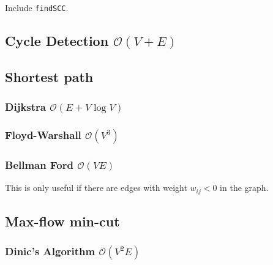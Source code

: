 \documentclass[8pt,a4paper,landscape,oneside]{amsart}
\begin{document}
\begin{multicols*}{3}
Include \texttt{findSCC}.



\subsection{Cycle Detection $\mathcal{O}(V + E)$}



\subsection{Shortest path}

\subsubsection{Dijkstra $\mathcal{O}(E + V \log V)$}

\subsubsection{Floyd-Warshall $\mathcal{O}(V^{3})$}



\subsubsection{Bellman Ford $\mathcal{O}(V E)$}

This is only useful if there are edges with weight $w_{i j} < 0$ in the graph.



\subsection{Max-flow min-cut}
\subsubsection{Dinic's Algorithm $\mathcal{O}(V^{2} E)$}

\begin{comment}
// http://www.slideshare.net/KuoE0/acmicpc-dinics-algorithm
\end{comment}


\end{multicols*}
\end{document}

